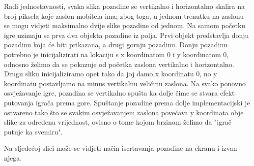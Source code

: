 \documentclass[times, utf8, zavrsni, numeric]{fer}
\begin{document}
	Radi jednostavnosti, svaka slika pozadine se  vertikalno i horizontalno skalira na broj piksela koje zaslon mobitela ima; zbog toga, u jednom trenutku na zaslonu se mogu vidjeti maksimalno dvije slike
	pozadine od jednom. Na samom početku igre uzimaju se prva dva objekta pozadine iz polja. Prvi objekt predstavlja donju pozadinu koja će biti prikazana, a drugi gornju pozadinu.  Donju pozadinu potrebno je inicijalizirati
	na lokaciju s x koordinatom 0 i y koordinatom 0, odnosno želimo da se pokazuje od početka zaslona vertikalno i horizontalno. Drugu sliku inicijaliziramo opet tako da joj damo x koordinatu 0, no y koordinatu postavljamo
	na minus vertikalnu veličinu zaslona. Na svako ponovno osvježavanje igre, pozadina se vertikalno spušta ka dolje čime se stvara efekt putovanja igrača prema gore. Spuštanje pozadine prema dolje implementacijski je 
	ostvareno tako što se svakim osvježavanjem zaslona povećava y koordinata obje slike za određenu vrijednost, ovisno o tome kojom brzinom želimo da "igrač putuje ka svemiru". 
	
	Na sljedećoj slici može se vidjeti način iscrtavanja pozadine na ekranu i izvan njega.
	
\end{document}
